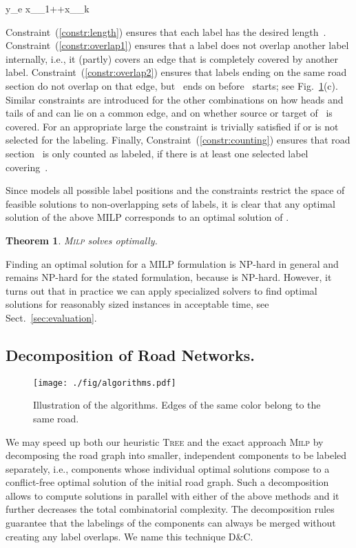 \documentclass[a4paper,11pt]{article}
\newtheorem{theorem}{Theorem}
\newcommand{\TreeAlgo}{\textsc{Tree}\xspace}
\newcommand{\ILPAlgo}{\textsc{Milp}\xspace}
\newcommand{\Shredder}{\textsc{D\&C}}
\begin{document}
y_e  \leq x_{\ell_1}+\cdots+x_{\ell_k}\label{constr:counting}

Constraint~(\ref{constr:length}) ensures that each label has the
desired length~. Constraint~(\ref{constr:overlap1})
ensures that a label does not overlap another label internally, i.e.,
it (partly) covers an edge that is completely covered by another
label. Constraint~(\ref{constr:overlap2}) ensures that labels ending
on the same road section do not overlap on that edge, but~ ends
on  before~ starts; see Fig.~\ref{fig:rules}(c). Similar
constraints are introduced for the other combinations on how heads and
tails of  and  can lie on a common edge, and on whether
source or target of~ is covered. For an appropriate large  the
constraint is trivially satisfied if  or  is not selected
for the labeling.  Finally, Constraint~(\ref{constr:counting}) ensures
that road section~ is only counted as labeled, if there is at least
one selected label covering~.

Since  models all possible label positions and the constraints restrict the space of feasible solutions to non-overlapping sets of labels, it is clear that any optimal solution of the above MILP corresponds to an optimal solution of \MaxTotalCovering.

\begin{theorem}
\ILPAlgo solves \MaxTotalCovering optimally.
\end{theorem}

Finding an optimal solution for a MILP formulation is NP-hard in
general and remains NP-hard for the stated formulation, because
\MaxTotalCovering is NP-hard. However, it turns out that in practice we can
apply specialized solvers to find optimal solutions for reasonably sized instances in acceptable time, see Sect.~\ref{sec:evaluation}. 


\subsection{Decomposition of Road Networks.}
\begin{figure}[t]
\centering
\texttt{[image: ./fig/algorithms.pdf]}
\caption{Illustration of the algorithms. Edges of the same color belong to the same road.}
\label{fig:rules}
\end{figure}

We may speed up both our heuristic \TreeAlgo and the exact approach \ILPAlgo by decomposing the road graph into smaller, independent components to be labeled separately, i.e., components whose individual optimal solutions compose to a conflict-free optimal solution of the initial road graph.  Such a decomposition allows to compute solutions in parallel with either of the above methods and it further decreases the total combinatorial complexity. The decomposition rules guarantee that the labelings of the components can always be merged without creating any label overlaps.
We name this technique \Shredder.
\end{document}
